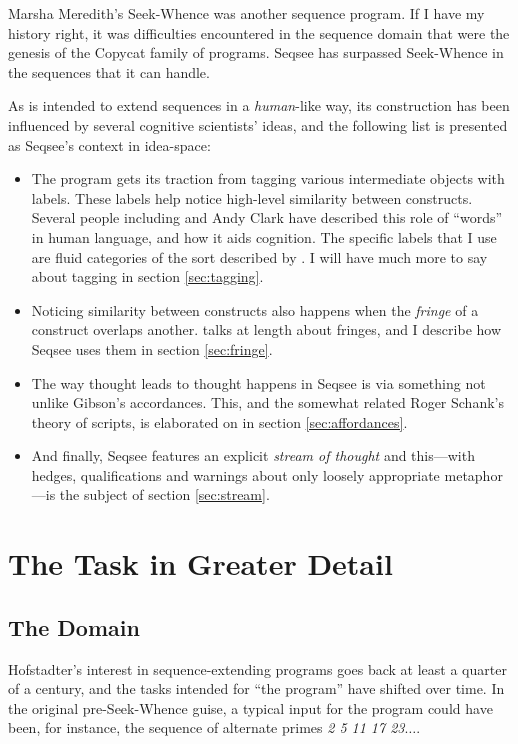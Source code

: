 \documentclass[letterpaper]{article}
\begin{document}
Marsha Meredith's Seek-Whence \cite{Meredith} was another sequence program. If I have my history right, it was difficulties encountered in the sequence domain that were the genesis of the Copycat family of programs. Seqsee has surpassed Seek-Whence in the sequences that it can handle.

As \seq is intended to extend sequences in a \emph{human}-like way, its construction has been influenced by several cognitive scientists' ideas, and the following list is presented as Seqsee's context in idea-space:

\begin{itemize}
\item The program gets its traction from tagging various intermediate objects with labels. These labels help \seq notice high-level similarity between constructs. Several people including  and Andy Clark \cite{Clark:MindWare,Clark:MagicWords} have described this role of ``words'' in human language, and how it aids cognition. The specific labels that I use are fluid categories of the sort described by \hof.
I will have much more to say about tagging in section \ref{sec:tagging}.

\item Noticing similarity between constructs also happens when the \emph{fringe} of a construct overlaps another.  talks at length about fringes, and I describe how Seqsee uses them in section \ref{sec:fringe}. 

\item The way thought leads to thought happens in Seqsee is via something not unlike Gibson's accordances.  This, and the somewhat related Roger Schank's theory of scripts, is elaborated on in section \ref{sec:affordances}.

\item And finally, Seqsee features an explicit \emph{stream of thought} \cite{James} and this---with hedges, qualifications and warnings about only loosely appropriate metaphor---is the subject of section \ref{sec:stream}.
\end{itemize}

\section{The Task in Greater Detail}
\label{sec:task}


\subsection{The Domain}
\label{sec:domain}
Hofstadter's interest in sequence-extending programs goes back at least a quarter of a century, and the tasks intended for ``the program'' have shifted over time. In the original pre-Seek-Whence guise, a typical input for the program could have been, for instance, the sequence of alternate primes \emph{2 5 11 17 23$\ldots$}.
\end{document}
